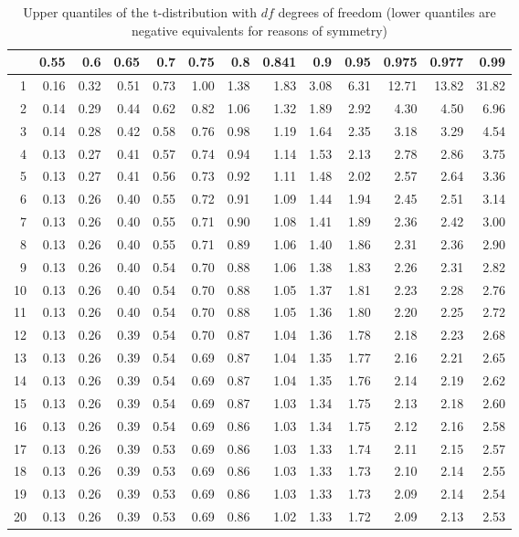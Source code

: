 \begin{table}[ht]
\centering
\begin{tabular}{rrrrrrrrrrrrr}
  \hline
 & 0.55 & 0.6 & 0.65 & 0.7 & 0.75 & 0.8 & 0.841 & 0.9 & 0.95 & 0.975 & 0.977 & 0.99 \\ 
  \hline
1 & 0.16 & 0.32 & 0.51 & 0.73 & 1.00 & 1.38 & 1.83 & 3.08 & 6.31 & 12.71 & 13.82 & 31.82 \\ 
  2 & 0.14 & 0.29 & 0.44 & 0.62 & 0.82 & 1.06 & 1.32 & 1.89 & 2.92 & 4.30 & 4.50 & 6.96 \\ 
  3 & 0.14 & 0.28 & 0.42 & 0.58 & 0.76 & 0.98 & 1.19 & 1.64 & 2.35 & 3.18 & 3.29 & 4.54 \\ 
  4 & 0.13 & 0.27 & 0.41 & 0.57 & 0.74 & 0.94 & 1.14 & 1.53 & 2.13 & 2.78 & 2.86 & 3.75 \\ 
  5 & 0.13 & 0.27 & 0.41 & 0.56 & 0.73 & 0.92 & 1.11 & 1.48 & 2.02 & 2.57 & 2.64 & 3.36 \\ 
  6 & 0.13 & 0.26 & 0.40 & 0.55 & 0.72 & 0.91 & 1.09 & 1.44 & 1.94 & 2.45 & 2.51 & 3.14 \\ 
  7 & 0.13 & 0.26 & 0.40 & 0.55 & 0.71 & 0.90 & 1.08 & 1.41 & 1.89 & 2.36 & 2.42 & 3.00 \\ 
  8 & 0.13 & 0.26 & 0.40 & 0.55 & 0.71 & 0.89 & 1.06 & 1.40 & 1.86 & 2.31 & 2.36 & 2.90 \\ 
  9 & 0.13 & 0.26 & 0.40 & 0.54 & 0.70 & 0.88 & 1.06 & 1.38 & 1.83 & 2.26 & 2.31 & 2.82 \\ 
  10 & 0.13 & 0.26 & 0.40 & 0.54 & 0.70 & 0.88 & 1.05 & 1.37 & 1.81 & 2.23 & 2.28 & 2.76 \\ 
  11 & 0.13 & 0.26 & 0.40 & 0.54 & 0.70 & 0.88 & 1.05 & 1.36 & 1.80 & 2.20 & 2.25 & 2.72 \\ 
  12 & 0.13 & 0.26 & 0.39 & 0.54 & 0.70 & 0.87 & 1.04 & 1.36 & 1.78 & 2.18 & 2.23 & 2.68 \\ 
  13 & 0.13 & 0.26 & 0.39 & 0.54 & 0.69 & 0.87 & 1.04 & 1.35 & 1.77 & 2.16 & 2.21 & 2.65 \\ 
  14 & 0.13 & 0.26 & 0.39 & 0.54 & 0.69 & 0.87 & 1.04 & 1.35 & 1.76 & 2.14 & 2.19 & 2.62 \\ 
  15 & 0.13 & 0.26 & 0.39 & 0.54 & 0.69 & 0.87 & 1.03 & 1.34 & 1.75 & 2.13 & 2.18 & 2.60 \\ 
  16 & 0.13 & 0.26 & 0.39 & 0.54 & 0.69 & 0.86 & 1.03 & 1.34 & 1.75 & 2.12 & 2.16 & 2.58 \\ 
  17 & 0.13 & 0.26 & 0.39 & 0.53 & 0.69 & 0.86 & 1.03 & 1.33 & 1.74 & 2.11 & 2.15 & 2.57 \\ 
  18 & 0.13 & 0.26 & 0.39 & 0.53 & 0.69 & 0.86 & 1.03 & 1.33 & 1.73 & 2.10 & 2.14 & 2.55 \\ 
  19 & 0.13 & 0.26 & 0.39 & 0.53 & 0.69 & 0.86 & 1.03 & 1.33 & 1.73 & 2.09 & 2.14 & 2.54 \\ 
  20 & 0.13 & 0.26 & 0.39 & 0.53 & 0.69 & 0.86 & 1.02 & 1.33 & 1.72 & 2.09 & 2.13 & 2.53 \\ 
   \hline
\end{tabular}
\caption{Upper quantiles of the t-distribution with $df$ degrees of freedom (lower quantiles are negative equivalents for reasons of symmetry)} 
\end{table}
